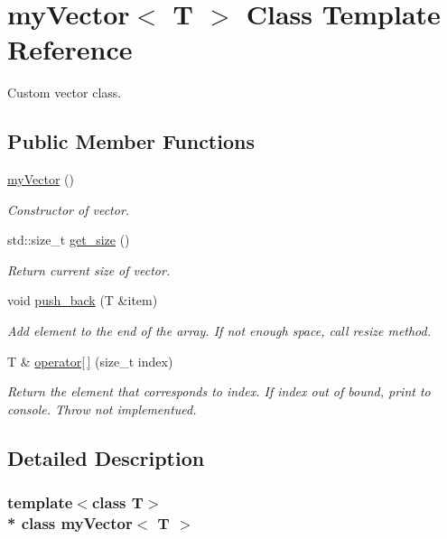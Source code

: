 \hypertarget{classmyVector}{}\section{my\+Vector$<$ T $>$ Class Template Reference}
\label{classmyVector}


Custom vector class.  


\subsection*{Public Member Functions}
\begin{DoxyCompactItemize}
\item 
\hyperlink{classmyVector_af4900f44e760432d50d9eeedfb98ef76}{my\+Vector} ()
\begin{DoxyCompactList}\small\item\em Constructor of vector. \end{DoxyCompactList}\item 
std\+::size\+\_\+t \hyperlink{classmyVector_a180ff02db4a940ec266326656fb96ef0}{get\+\_\+size} ()
\begin{DoxyCompactList}\small\item\em Return current size of vector. \end{DoxyCompactList}\item 
void \hyperlink{classmyVector_ae0293100858614d4a82a51f23e9007c4}{push\+\_\+back} (T \&item)
\begin{DoxyCompactList}\small\item\em Add element to the end of the array. If not enough space, call resize method. \end{DoxyCompactList}\item 
T \& \hyperlink{classmyVector_af8d7ce882fd600c5331c171dc092e6d7}{operator\mbox{[}$\,$\mbox{]}} (size\+\_\+t index)
\begin{DoxyCompactList}\small\item\em Return the element that corresponds to index. If index out of bound, print to console. Throw not implementued. \end{DoxyCompactList}\end{DoxyCompactItemize}


\subsection{Detailed Description}
\subsubsection*{template$<$class T$>$\\*
class my\+Vector$<$ T $>$}

